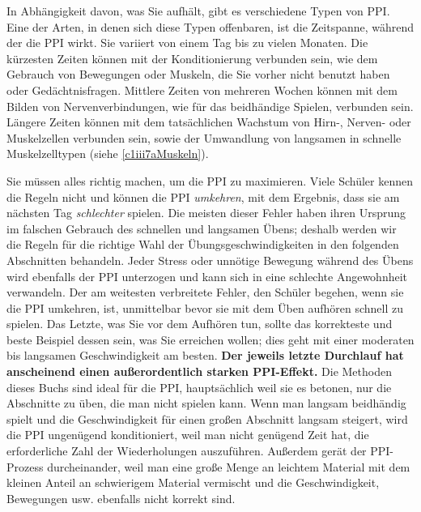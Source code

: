 In Abhängigkeit davon, was Sie aufhält, gibt es verschiedene Typen von PPI.
Eine der Arten, in denen sich diese Typen offenbaren, ist die Zeitspanne, während der die PPI wirkt.
Sie variiert von einem Tag bis zu vielen Monaten.
Die kürzesten Zeiten können mit der Konditionierung verbunden sein, wie dem Gebrauch von Bewegungen oder Muskeln, die Sie vorher nicht benutzt haben oder Gedächtnisfragen.
Mittlere Zeiten von mehreren Wochen können mit dem Bilden von Nervenverbindungen, wie für das beidhändige Spielen, verbunden sein.
Längere Zeiten können mit dem tatsächlichen Wachstum von Hirn-, Nerven- oder Muskelzellen verbunden sein, sowie der Umwandlung von langsamen in schnelle Muskelzelltypen (siehe \hyperref[c1iii7aMuskeln]{\ref*{c1iii7aMuskeln}}).

Sie müssen alles richtig machen, um die PPI zu maximieren.
Viele Schüler kennen die Regeln nicht und können die PPI \textit{umkehren}, mit dem Ergebnis, dass sie am nächsten Tag \textit{schlechter} spielen.
Die meisten dieser Fehler haben ihren Ursprung im falschen Gebrauch des schnellen und langsamen Übens; deshalb werden wir die Regeln für die richtige Wahl der Übungsgeschwindigkeiten in den folgenden Abschnitten behandeln.
Jeder Stress oder unnötige Bewegung während des Übens wird ebenfalls der PPI unterzogen und kann sich in eine schlechte Angewohnheit verwandeln.
Der am weitesten verbreitete Fehler, den Schüler begehen, wenn sie die PPI umkehren, ist, unmittelbar bevor sie mit dem Üben aufhören schnell zu spielen.
Das Letzte, was Sie vor dem Aufhören tun, sollte das korrekteste und beste Beispiel dessen sein, was Sie erreichen wollen; dies geht mit einer moderaten bis langsamen Geschwindigkeit am besten.
\textbf{Der jeweils letzte Durchlauf hat anscheinend einen außerordentlich starken PPI-Effekt.}
Die Methoden dieses Buchs sind ideal für die PPI, hauptsächlich weil sie es betonen, nur die Abschnitte zu üben, die man nicht spielen kann.
Wenn man langsam beidhändig spielt und die Geschwindigkeit für einen großen Abschnitt langsam steigert, wird die PPI ungenügend konditioniert, weil man nicht genügend Zeit hat, die erforderliche Zahl der Wiederholungen auszuführen.
Außerdem gerät der PPI-Prozess durcheinander, weil man eine große Menge an leichtem Material mit dem kleinen Anteil an schwierigem Material vermischt und die Geschwindigkeit, Bewegungen usw. ebenfalls nicht korrekt sind.

